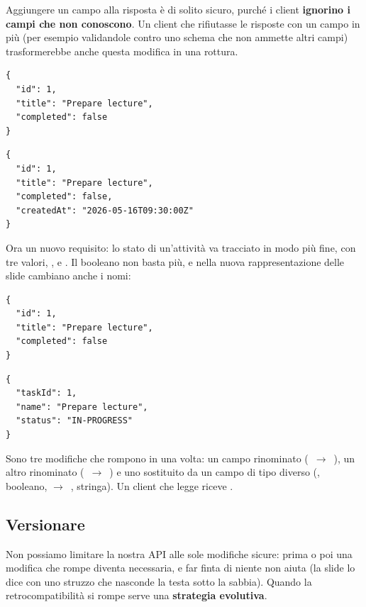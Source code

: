 Aggiungere un campo alla risposta è di solito sicuro, purché i client
\textbf{ignorino i campi che non conoscono}. Un client che rifiutasse le
risposte con un campo in più (per esempio validandole contro uno schema che non
ammette altri campi) trasformerebbe anche questa modifica in una rottura.

\begin{affianco}[0.48]
\begin{lstlisting}[style=json, name=prima]
{
  "id": 1,
  "title": "Prepare lecture",
  "completed": false
}
\end{lstlisting}
\risultato
\begin{lstlisting}[style=json, name=dopo: un campo in più]
{
  "id": 1,
  "title": "Prepare lecture",
  "completed": false,
  "createdAt": "2026-05-16T09:30:00Z"
}
\end{lstlisting}
\end{affianco}

Ora un nuovo requisito: lo stato di un'attività va tracciato in modo più fine,
con tre valori, ,  e . Il booleano
 non basta più, e nella nuova rappresentazione delle slide
cambiano anche i nomi:

\begin{affianco}[0.48]
\begin{lstlisting}[style=json, name=prima]
{
  "id": 1,
  "title": "Prepare lecture",
  "completed": false
}
\end{lstlisting}
\risultato
\begin{lstlisting}[style=json, name=dopo: non retrocompatibile]
{
  "taskId": 1,
  "name": "Prepare lecture",
  "status": "IN-PROGRESS"
}
\end{lstlisting}
\end{affianco}

Sono tre modifiche che rompono in una volta: un campo rinominato
(~$\to$~), un altro rinominato
(~$\to$~) e uno sostituito da un campo di tipo diverso
(, booleano, $\to$~, stringa). Un client che legge
 riceve .

\subsection{Versionare}

Non possiamo limitare la nostra API alle sole modifiche sicure: prima o poi una
modifica che rompe diventa necessaria, e far finta di niente non aiuta (la
slide lo dice con uno struzzo che nasconde la testa sotto la sabbia). Quando la
retrocompatibilità si rompe serve una \textbf{strategia evolutiva}.


